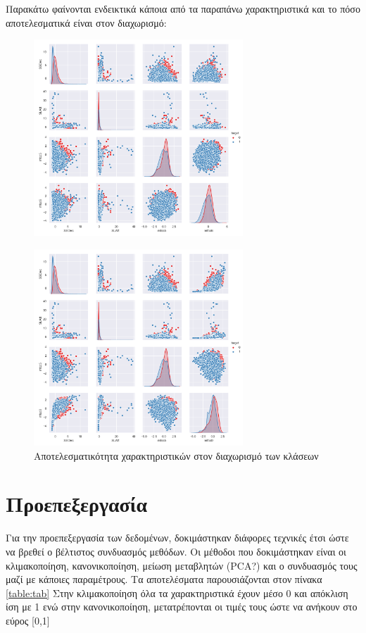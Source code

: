 \par Παρακάτω φαίνονται ενδεικτικά κάποια από τα παραπάνω χαρακτηριστικά και το πόσο αποτελεσματικά είναι στον διαχωρισμό:

\begin{figure}[H]
\centering
\includegraphics[width=0.7\textwidth]{figure_1.png}
\end{figure}
\begin{figure}[h]
\centering
\includegraphics[width=0.7\textwidth]{figure_2.png}
\caption{Αποτελεσματικότητα χαρακτηριστικών στον διαχωρισμό των κλάσεων}
\end{figure}


\section{Προεπεξεργασία}
Για την προεπεξεργασία των δεδομένων, δοκιμάστηκαν διάφορες τεχνικές έτσι ώστε να βρεθεί ο βέλτιστος συνδυασμός μεθόδων. Οι μέθοδοι που δοκιμάστηκαν είναι οι κλιμακοποίηση, κανονικοποίηση, μείωση μεταβλητών (PCA?) και ο συνδυασμός τους μαζί με κάποιες παραμέτρους. Τα αποτελέσματα παρουσιάζονται στον πίνακα \ref{table:tab}
Στην κλιμακοποίηση όλα τα χαρακτηριστικά έχουν μέσο 0 και απόκλιση ίση με 1 ενώ στην κανονικοποίηση, μετατρέπονται οι τιμές τους ώστε να ανήκουν στο εύρος [0,1]

